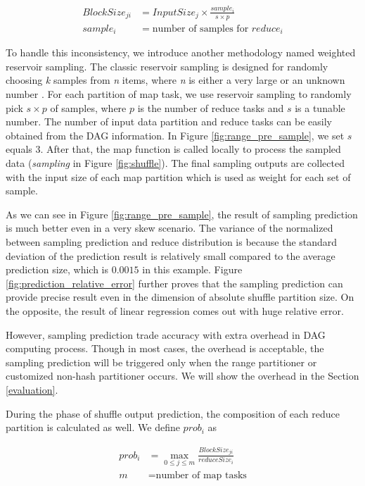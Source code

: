 \begin{equation}
\label{equationsample}
\begin{aligned}
	BlockSize_{ji} &= {{InputSize_j \times \frac{sample_i}{s \times p}}} \\
	sample_i &= \text{number of samples for $reduce_i$}
\end{aligned}
\end{equation}

To handle this inconsistency, we introduce another methodology named weighted reservoir sampling. The classic reservoir sampling is designed for randomly choosing \textit{k} samples from \textit{n} items, where \textit{n} is either a very large or an unknown number \cite{reservoir}. For each partition of map task, we use reservoir sampling to randomly pick $s \times p$ of samples, where $p$ is the number of reduce tasks and $s$ is a tunable number. The number of input data partition and reduce tasks can be easily obtained from the DAG information. In Figure \ref{fig:range_pre_sample}, we set $s$ equals $3$. After that, the map function is called locally to process the sampled data (\textit{sampling} in Figure \ref{fig:shuffle}). The final sampling outputs are collected with the input size of each map partition which is used as weight for each set of sample.

As we can see in Figure \ref{fig:range_pre_sample}, the result of sampling prediction is much better even in a very skew scenario. The variance of the normalized between sampling prediction and reduce distribution is because the standard deviation of the prediction result is relatively small compared to the average prediction size, which is $0.0015$ in this example. Figure \ref{fig:prediction_relative_error} further proves that the sampling prediction can provide precise result even in the dimension of absolute shuffle partition size. On the opposite, the result of linear regression comes out with huge relative error.

However, sampling prediction trade accuracy with extra overhead in DAG computing process. Though in most cases, the overhead is acceptable, the sampling prediction will be triggered only when the range partitioner or customized non-hash partitioner occurs. We will show the overhead in the Section \ref{evaluation}.

During the phase of shuffle output prediction, the composition of each reduce partition is calculated as well. We define $prob_i$ as

\begin{equation}
\label{equationprob}
\begin{aligned}
	prob_i &= \max_{0 \leq j \leq m} \frac{BlockSize_{ji}}{reduceSize_i} \\
    m &= \text{number of map tasks}
\end{aligned}
\end{equation}

